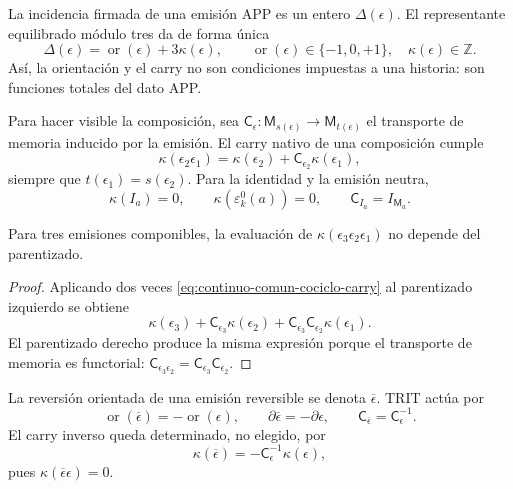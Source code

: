 La incidencia firmada de una emisión APP es un entero
\(\Delta(\epsilon)\).  El representante equilibrado módulo tres da de forma
única
\begin{equation}
\label{eq:continuo-comun-trit-euclid}
 \Delta(\epsilon)
 =\operatorname{or}(\epsilon)+3\kappa(\epsilon),
 \qquad
 \operatorname{or}(\epsilon)\in\{-1,0,+1\},
 \quad
 \kappa(\epsilon)\in\mathbb Z.
\end{equation}
Así, la orientación y el carry no son condiciones impuestas a una historia:
son funciones totales del dato APP.

Para hacer visible la composición, sea
\(\mathsf C_{\epsilon}:\mathsf M_{s(\epsilon)}\to
\mathsf M_{t(\epsilon)}\) el transporte de memoria inducido por la emisión.
El carry nativo de una composición cumple
\begin{equation}
\label{eq:continuo-comun-cociclo-carry}
 \kappa(\epsilon_2\epsilon_1)
 =\kappa(\epsilon_2)
  +\mathsf C_{\epsilon_2}\kappa(\epsilon_1),
\end{equation}
siempre que \(t(\epsilon_1)=s(\epsilon_2)\).  Para la identidad y la emisión
neutra,
\begin{equation}
\label{eq:continuo-comun-carry-unidad}
 \kappa(I_a)=0,
 \qquad
 \kappa(\varepsilon^0_k(a))=0,
 \qquad
 \mathsf C_{I_a}=I_{\mathsf M_a}.
\end{equation}

\begin{lemma}
\label{lem:continuo-comun-asociatividad-carry}
Para tres emisiones componibles, la evaluación de
\(\kappa(\epsilon_3\epsilon_2\epsilon_1)\) no depende del parentizado.
\end{lemma}

\begin{proof}
Aplicando dos veces \eqref{eq:continuo-comun-cociclo-carry} al parentizado
izquierdo se obtiene
\[
 \kappa(\epsilon_3)
 +\mathsf C_{\epsilon_3}\kappa(\epsilon_2)
 +\mathsf C_{\epsilon_3}\mathsf C_{\epsilon_2}
  \kappa(\epsilon_1).
\]
El parentizado derecho produce la misma expresión porque el transporte de
memoria es functorial:
\(\mathsf C_{\epsilon_3\epsilon_2}
=\mathsf C_{\epsilon_3}\mathsf C_{\epsilon_2}\).
\end{proof}

La reversión orientada de una emisión reversible se denota
\(\overline\epsilon\).  TRIT actúa por
\begin{equation}
\label{eq:continuo-comun-reversion-trit}
 \operatorname{or}(\overline\epsilon)
 =-\operatorname{or}(\epsilon),
 \qquad
 \partial\overline\epsilon=-\partial\epsilon,
 \qquad
 \mathsf C_{\overline\epsilon}=\mathsf C_\epsilon^{-1}.
\end{equation}
El carry inverso queda determinado, no elegido, por
\begin{equation}
\label{eq:continuo-comun-carry-inverso}
 \kappa(\overline\epsilon)
 =-\mathsf C_\epsilon^{-1}\kappa(\epsilon),
\end{equation}
pues \(\kappa(\overline\epsilon\epsilon)=0\).

